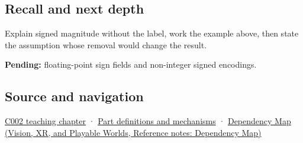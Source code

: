 \subsection{Recall and next depth}\label{appendix-ce20506c8532-recall-and-next-depth}

Explain signed magnitude without the label, work the example above, then state the assumption whose removal would change the result.

\textbf{Pending:} floating-point sign fields and non-integer signed encodings.

\subsection{Source and navigation}\label{appendix-ce20506c8532-source-and-navigation}

\hyperref[01-foundations-i-ch001-arithmetic-becomes-a-policy]{C002 teaching chapter} · \hyperref[appendix-fd090d982a15]{Part definitions and mechanisms} · \href{../07-Vision-XR-and-Playable-Worlds/main.pdf\#nameddest=appendix-4ad47bdd269a}{Dependency Map (Vision, XR, and Playable Worlds, Reference notes: Dependency Map)}
